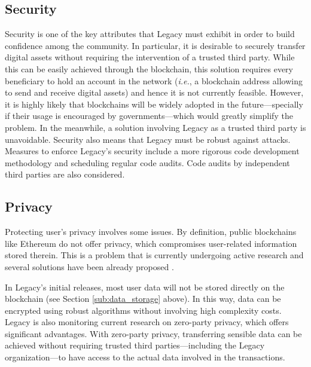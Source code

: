 


\subsection{Security} %
\label{sub:security}
Security is one of the key attributes that Legacy must exhibit in order to build confidence among the community. 
In particular, it is desirable to securely transfer digital assets without requiring the intervention of a trusted third party. 
While this can be easily achieved through the blockchain, this solution requires every beneficiary to hold an account in the network (\textit{i.e.}, a blockchain address allowing to send and receive digital assets) and hence it is not currently feasible.
However, it is highly likely that blockchains will be widely adopted in the future---specially if their usage is encouraged by governments---which would greatly simplify the problem.
In the meanwhile, a solution involving Legacy as a trusted third party is unavoidable.
Security also means that Legacy must be robust against attacks. Measures to enforce Legacy's security include a more rigorous code development methodology and scheduling regular code audits. Code audits by independent third parties are also considered.



\subsection{Privacy} %
\label{sub:privacy}
Protecting user's privacy involves some issues. By definition, public blockchains like Ethereum do not offer privacy, which compromises user-related information stored therein. This is a problem that is currently undergoing active research and several solutions have been already proposed \cite{Buterin}. 

In Legacy's initial releases, most user data will not be stored directly on the blockchain (see Section \ref{sub:data_storage} above). In this way, data can be encrypted using robust algorithms without involving high complexity costs.
Legacy is also monitoring current research on zero-party privacy, which offers significant advantages. With zero-party privacy, transferring sensible data can be achieved without requiring trusted third parties---including the Legacy organization---to have access to the actual data involved in the transactions.

